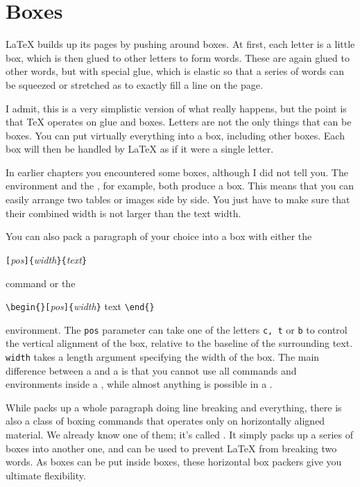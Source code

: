 \section{Boxes}\label{sec:boxes}
\LaTeX{} builds up its pages by pushing around boxes. At first, each
letter is a little box, which is then glued to other letters to form
words. These are again glued to other words, but with special glue,
which is elastic so that a series of words can be squeezed or
stretched as to exactly fill a line on the page.

I admit, this is a very simplistic version of what really happens, but the
point is that \TeX{} operates on glue and boxes. Letters are not the only
things that can be boxes. You can put virtually everything into a box,
including other boxes. Each box will then be handled by \LaTeX{} as if it
were a single letter.

In earlier chapters you encountered some boxes, although I did
not tell you. The  environment and the , for
example, both produce a box. This means that you can easily arrange two
tables or images side by side. You just have to make sure that their
combined width is not larger than the text width.

You can also pack a paragraph of your choice into a box with either
the

\begin{lscommand}
  \verb|[|\emph{pos}\verb|]{|\emph{width}\verb|}{|\emph{text}\verb|}|
\end{lscommand}

\noindent command or the

\begin{lscommand}
  \verb|\begin{|\verb|}[|\emph{pos}\verb|]{|\emph{width}\verb|}| text
  \verb|\end{|\verb|}|
\end{lscommand}

\noindent environment. The \texttt{pos} parameter can take one of the letters
\texttt{c, t} or \texttt{b} to control the vertical alignment of the box,
relative to the baseline of the surrounding text. \texttt{width} takes
a length argument specifying the width of the box. The main difference
between a  and a  is that you cannot use all commands
and environments inside a , while almost anything is possible in
a .

While  packs up a whole paragraph doing line breaking and
everything, there is also a class of boxing commands that operates
only on horizontally aligned material. We already know one of them;
it's called . It simply packs up a series of boxes into
another one, and can be used to prevent \LaTeX{} from breaking two
words. As boxes can be put inside boxes, these horizontal box packers
give you ultimate flexibility.

